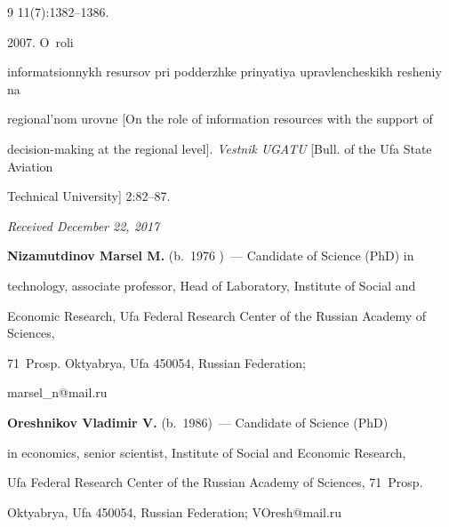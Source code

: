 {{\begin{thebibliography}{9}
11(7):1382--1386.




 2007. O~roli 


informatsionnykh resursov pri podderzhke prinyatiya upravlencheskikh resheniy na 


regional'nom urovne [On the role of information resources with the support of 


decision-making at the regional level]. \textit{Vestnik UGATU} [Bull. of the Ufa State Aviation 


Technical University] 2:82--87.


\end{thebibliography}


} }








\vspace*{-3pt}





\hfill{\small\textit{Received December 22, 2017}}  





  \Contr


  


  \noindent


  \textbf{Nizamutdinov Marsel M.} (b.\ 1976 )~--- Candidate of Science  (PhD) in 


technology, associate professor, Head of Laboratory, Institute of Social and 


Economic Research, Ufa Federal Research Center of the Russian Academy of Sciences, 


71~Prosp. Oktyabrya, Ufa 450054, Russian Federation; 


\mbox{marsel\_n@mail.ru}


  


  \vspace*{3pt}


  


  \noindent


  \textbf{Oreshnikov Vladimir V.} (b.\ 1986)~--- Candidate of Science (PhD) 


in economics, senior scientist, Institute of Social and Economic Research, 


Ufa Federal Research Center of the Russian Academy of Sciences, 71~Prosp. 


Oktyabrya, Ufa 450054, Russian Federation; \mbox{VOresh@mail.ru}


\label{end\stat}








\renewcommand{\bibname}{\protect\rm Литература}


